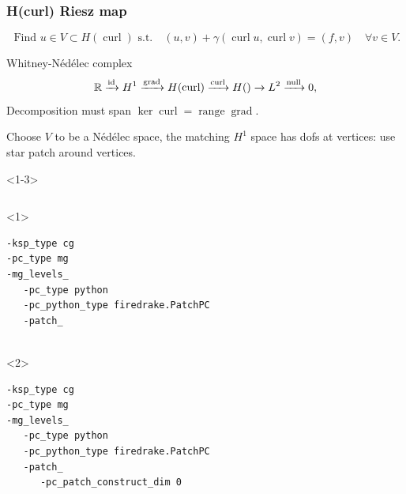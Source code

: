 \documentclass[presentation,aspectratio=43, 10pt]{beamer}
\DeclareMathOperator{\grad}{grad}
\let\div\relax
\DeclareMathOperator{\div}{div}
\DeclareMathOperator{\curl}{curl}
\DeclareMathOperator{\range}{range}
\begin{document}
\begin{frame}[fragile,t]
  \frametitle{H(curl) Riesz map}
  \vspace{-1.5\baselineskip}
  \begin{equation*}
    \text{  Find $u \in V \subset H(\curl)$ s.t.} \quad (u, v) + \gamma (\curl u, \curl v) = (f, v) \quad \forall v \in V.
  \end{equation*}
  \vspace{-\baselineskip}
  \begin{block}{Whitney-N\'ed\'elec complex}
    \begin{equation*}
      \mathbb{R} \xrightarrow{\operatorname{id}} H^1 \xrightarrow{\grad} H(\curl)
      \xrightarrow{\curl} H(\div) \xrightarrow{\div} L^2 \xrightarrow{\operatorname{null}} 0,
    \end{equation*}
    Decomposition must span $\ker \curl = \range \grad$.

    Choose $V$ to be a N\'ed\'elec space, the matching $H^1$
    space has dofs at vertices: use star patch around vertices.
  \end{block}
  \begin{onlyenv}<1-3>
    \begin{columns}
      \begin{column}{0.6\textwidth}
        \begin{onlyenv}<1>
\begin{verbatim}
-ksp_type cg
-pc_type mg
-mg_levels_
   -pc_type python
   -pc_python_type firedrake.PatchPC
   -patch_


\end{verbatim}
        \end{onlyenv}
        \begin{onlyenv}<2>
\begin{verbatim}
-ksp_type cg
-pc_type mg
-mg_levels_
   -pc_type python
   -pc_python_type firedrake.PatchPC
   -patch_
      -pc_patch_construct_dim 0


\end{verbatim}
\end{onlyenv}
\end{column}
\end{columns}
\end{onlyenv}
\end{frame}
\end{document}
